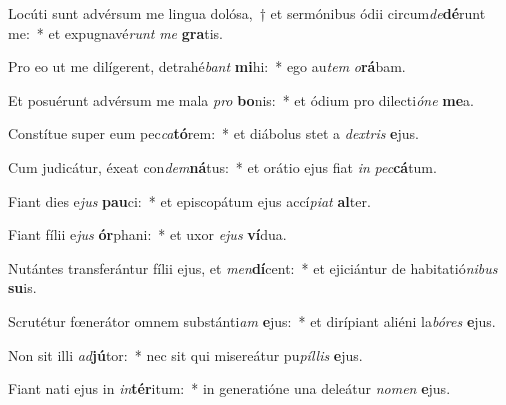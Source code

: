 \item Locúti sunt advérsum me lingua dolósa,~† et sermónibus ódii circum\textit{de}\textbf{dé}runt me:~* et expugnavé\textit{runt} \textit{me} \textbf{gra}tis.
\item Pro eo ut me dilígerent, detrahé\textit{bant} \textbf{mi}hi:~* ego au\textit{tem} \textit{o}\textbf{rá}bam.
\item Et posuérunt advérsum me mala \textit{pro} \textbf{bo}nis:~* et ódium pro dilecti\textit{ó}\textit{ne} \textbf{me}a.
\item Constítue super eum pec\textit{ca}\textbf{tó}rem:~* et diábolus stet a \textit{dex}\textit{tris} \textbf{e}jus.
\item Cum judicátur, éxeat con\textit{dem}\textbf{ná}tus:~* et orátio ejus fiat \textit{in} \textit{pec}\textbf{cá}tum.
\item Fiant dies e\textit{jus} \textbf{pau}ci:~* et episcopátum ejus accí\textit{pi}\textit{at} \textbf{al}ter.
\item Fiant fílii e\textit{jus} \textbf{ór}phani:~* et uxor \textit{e}\textit{jus} \textbf{ví}dua.
\item Nutántes transferántur fílii ejus, et \textit{men}\textbf{dí}cent:~* et ejiciántur de habitatió\textit{ni}\textit{bus} \textbf{su}is.
\item Scrutétur fœnerátor omnem substánti\textit{am} \textbf{e}jus:~* et dirípiant aliéni la\textit{bó}\textit{res} \textbf{e}jus.
\item Non sit illi \textit{ad}\textbf{jú}tor:~* nec sit qui misereátur pu\textit{píl}\textit{lis} \textbf{e}jus.
\item Fiant nati ejus in \textit{in}\textbf{tér}itum:~* in generatióne una deleátur \textit{no}\textit{men} \textbf{e}jus.
